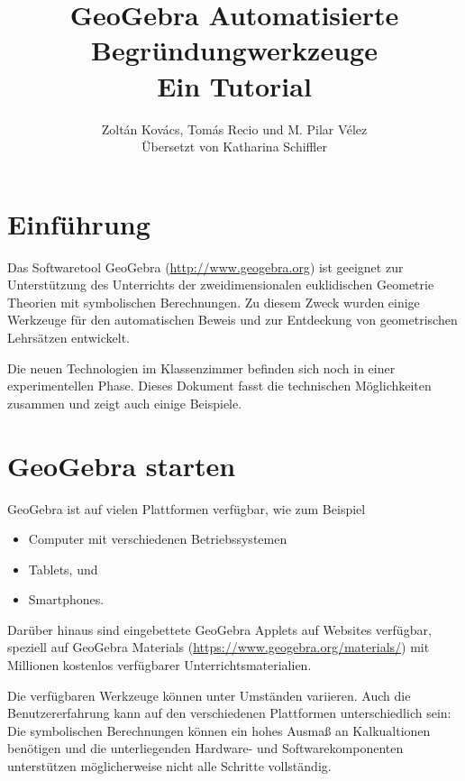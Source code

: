 \documentclass{article}
\title{GeoGebra Automatisierte Begründungwerkzeuge\\ \large Ein Tutorial}
\author{Zolt\'an Kov\'acs, Tom\'as Recio und M. Pilar V\'elez\\
Übersetzt von Katharina Schiffler
}
\begin{document}

\maketitle

\section{Einführung}

Das Softwaretool GeoGebra (\url{http://www.geogebra.org}) ist geeignet zur Unterstützung des Unterrichts der zweidimensionalen euklidischen Geometrie Theorien mit symbolischen Berechnungen. Zu diesem Zweck wurden einige Werkzeuge für den automatischen Beweis und zur Entdeckung von geometrischen Lehrsätzen entwickelt.

Die neuen Technologien im Klassenzimmer befinden sich noch in einer experimentellen Phase. Dieses Dokument fasst die technischen Möglichkeiten zusammen und zeigt auch einige Beispiele.

\section{GeoGebra starten}

GeoGebra ist auf vielen Plattformen verfügbar, wie zum Beispiel
\begin{itemize}
    \item Computer mit verschiedenen Betriebssystemen
    \item Tablets, und
    \item Smartphones.
\end{itemize}
Darüber hinaus sind eingebettete GeoGebra Applets auf Websites verfügbar, speziell auf GeoGebra Materials (\url{https://www.geogebra.org/materials/}) mit Millionen kostenlos verfügbarer Unterrichtsmaterialien.

Die verfügbaren Werkzeuge können unter Umständen variieren. Auch die Benutzererfahrung kann auf den verschiedenen Plattformen unterschiedlich sein: Die symbolischen Berechnungen können ein hohes Ausmaß an Kalkualtionen benötigen und die unterliegenden Hardware- und Softwarekomponenten unterstützen möglicherweise nicht alle Schritte vollständig.
\end{document}
